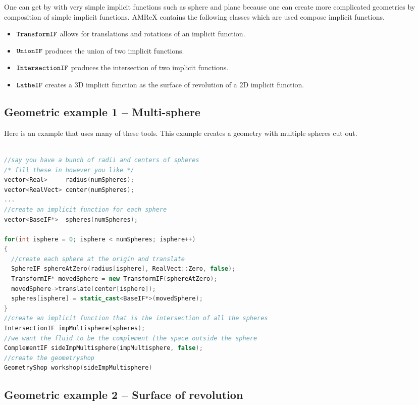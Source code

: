 One can get by with very simple implicit functions such as sphere and
plane because one can create more complicated geometries by
composition of simple implicit functions.    AMReX contains the
following classes which are used compose implicit functions.
\begin{itemize}
\item $\tt{TransformIF}$    allows for translations and rotations of an implicit function.
\item $\tt{UnionIF}$        produces the union of two implicit functions.  
\item $\tt{IntersectionIF}$ produces the intersection of two implicit functions.
\item $\tt{LatheIF}$        creates a 3D implicit function as the surface of
  revolution of a 2D implicit function.
\end{itemize}
\subsection{Geometric example 1 -- Multi-sphere}
Here is an example that uses many of these tools.  This example
creates a geometry with multiple spheres cut out.

\begin{lstlisting}[language=cpp]

//say you have a bunch of radii and centers of spheres
/* fill these in however you like */
vector<Real>     radius(numSpheres);
vector<RealVect> center(numSpheres);
...
//create an implicit function for each sphere
vector<BaseIF*>  spheres(numSpheres);

for(int isphere = 0; isphere < numSpheres; isphere++)
{
  //create each sphere at the origin and translate
  SphereIF sphereAtZero(radius[isphere], RealVect::Zero, false);
  TransformIF* movedSphere = new TransformIF(sphereAtZero);
  movedSphere->translate(center[isphere]);
  spheres[isphere] = static_cast<BaseIF*>(movedSphere);
}
//create an implicit function that is the intersection of all the spheres
IntersectionIF impMultisphere(spheres);
//we want the fluid to be the complement (the space outside the sphere
ComplementIF sideImpMultisphere(impMultisphere, false);
//create the geometryshop
GeometryShop workshop(sideImpMultisphere)
\end{lstlisting}

\subsection{Geometric example 2 -- Surface of revolution}

